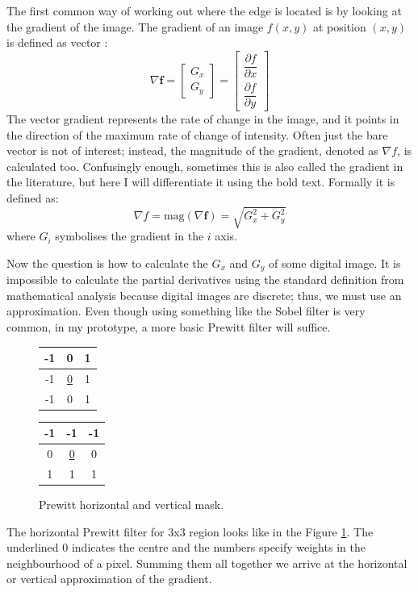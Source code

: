 \documentclass[
  digital,     %
  oneside,     %
  nosansbold,  %
  nocolorbold, %
  lof,         %
  lot,         %
]{fithesis4}
\begin{document}
The first common way of working out where the edge is located is by looking at
the gradient of the image. The gradient of an image $f(x,y)$ at position $(x,
y)$ is defined as vector
\parencite{gonzalez2002}:
$$\nabla \textbf{f} =
\begin{bmatrix}
    G_x \\
    G_y
\end{bmatrix} =
\begin{bmatrix}
    \dfrac{\partial f}{\partial x}\\[2ex]
    \dfrac{\partial f}{\partial y}
\end{bmatrix}$$
The vector gradient represents the rate of change in the image, and it points in
the direction of the maximum rate of change of intensity. Often just the bare
vector is not of interest; instead, the magnitude of the gradient, denoted as
$\nabla f$, is calculated too. Confusingly enough, sometimes this is also called
the gradient in the literature, but here I will differentiate it using the bold
text. Formally it is defined as:
$$\nabla f = \text{mag}(\nabla \textbf{f}) = \sqrt{G_x^2 + G_y^2}$$
where $G_i$ symbolises the gradient in the $i$ axis.

Now the question is how to calculate the $G_x$ and $G_y$ of some digital image.
It is impossible to calculate the partial derivatives using the standard
definition from mathematical analysis because digital images are discrete; thus,
we must use an approximation. Even though using something like the Sobel filter
is very common, in my prototype, a more basic Prewitt filter will suffice.
\begin{figure}
    \begin{center}
        \begin{tabular}{ |c|c|c| }
            \hline
            -1 & 0 & 1 \\
            \hline
            -1 & \underline{0} & 1 \\
            \hline
            -1 & 0 & 1 \\
            \hline
        \end{tabular}
        \begin{tabular}{ |c|c|c| }
            \hline
            -1 & -1 & -1 \\
            \hline
            0 & \underline{0} & 0 \\
            \hline
            1 & 1 & 1 \\
            \hline
        \end{tabular}
    \end{center}
    \caption{Prewitt horizontal and vertical mask.}
    \label{table:prewitt}
\end{figure}
The horizontal Prewitt filter for 3x3 region looks like in the Figure
\ref{table:prewitt}.
The underlined 0 indicates the centre and the numbers specify weights in the
neighbourhood of a pixel. Summing them all together we arrive at the horizontal or
vertical approximation of the gradient.
\end{document}

